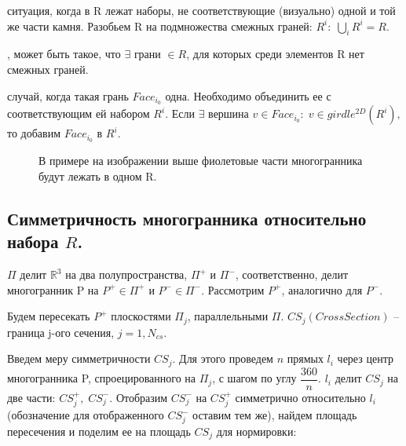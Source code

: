 \begin{remark}
	 ситуация, когда в R лежат наборы, не соответствующие (визуально) одной и той же части камня. Разобьем R на подмножества смежных граней: $R^i:\; \bigcup_i R^i = R.$ 

	, может быть такое, что $\exists$ грани $\in R$, для которых среди элементов R нет смежных граней. 

	 случай, когда такая грань $Face_{i_0}$ одна. Необходимо объединить ее с соответствующим ей набором $R^i$. Если $\exists $ вершина $v \in Face_{i_0}: \; v \in girdle^{2D}(R^i), $ то добавим $Face_{i_0}$ в $R^i$.

	\begin{figure}[h!]
	\caption{В примере на изображении выше фиолетовые части многогранника будут лежать в одном R.}
	\end{figure}\newpage
\end{remark}

\subsection*{\Large{Симметричность многогранника относительно набора $R$}.}

$\Pi$ делит $\mathbb{R}^3$ на два полупространства, $\Pi^+$ и $\Pi^-$, соответственно, делит многогранник P на $P^+ \in \Pi^+$ и $P^- \in \Pi^-$. Рассмотрим $P^+$, аналогично для $P^-$.\vspace{1cm}

\begin{figure}[h!]
\end{figure}\vspace{1cm}

Будем пересекать $P^+$ плоскостями $\Pi_j$, параллельными $\Pi$. $CS_j(Cross Section)$ -- граница j-ого сечения, $j = 1, N_{cs}.$\newpage

\begin{figure}[h!]
\end{figure}

Введем меру симметричности $CS_j$. Для этого проведем $n$ прямых $l_i$ через центр многогранника P, спроецированного на $\Pi_j$, с шагом по углу $\dfrac{360}{n}$. $l_i$ делит $CS_j$ на две части: $CS_j^+, \; CS_j^-$. Отобразим $CS_j^-$ на $CS_j^+$ симметрично относительно $l_i$ (обозначение для отображенного $CS_j^-$ оставим тем же), найдем площадь пересечения и поделим ее на площадь $CS_j$ для нормировки:

